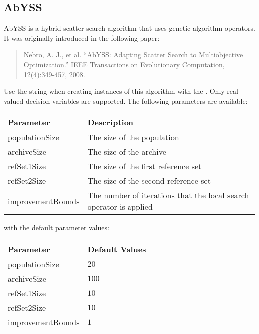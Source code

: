 \subsection{AbYSS}
AbYSS is a hybrid scatter search algorithm that uses genetic algorithm operators.  It was originally introduced in the following paper:
\begin{quote}
Nebro, A. J., et al.  ``AbYSS: Adapting Scatter Search to Multiobjective Optimization.''  IEEE Transactions on Evolutionary Computation, 12(4):349-457, 2008.
\end{quote}
Use the string  when creating instances of this algorithm with the .  Only real-valued decision variables are supported.  The following parameters are available:
\newline
\newline
\begin{tabularx}{\linewidth}{lX}
  \hline
  Parameter & Description \\
  \hline
  populationSize & The size of the population \\
  archiveSize & The size of the archive \\
  refSet1Size & The size of the first reference set \\
  refSet2Size & The size of the second reference set \\
  improvementRounds & The number of iterations that the local search operator is applied \\
  \hline
\end{tabularx}
\newline
\newline
with the default parameter values:
\newline
\newline
\begin{tabularx}{\linewidth}{lX}
  \hline
  Parameter & Default Values\\
  \hline
  populationSize & $20$ \\
  archiveSize & $100$ \\
  refSet1Size & $10$ \\
  refSet2Size & $10$ \\
  improvementRounds & $1$ \\
  \hline
\end{tabularx}

